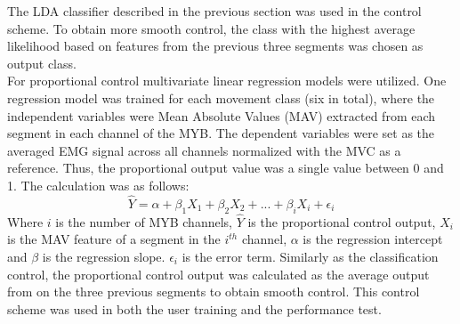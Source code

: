 The LDA classifier described in the previous section was used in the control scheme. To obtain more smooth control, the class with the highest average likelihood based on features from the previous three segments was chosen as output class. \\
For proportional control multivariate linear regression models were utilized. One regression model was trained for each movement class (six in total), where the independent variables were Mean Absolute Values (MAV) extracted from each segment in each channel of the MYB. The dependent variables were set as the averaged EMG signal across all channels normalized with the MVC as a reference. Thus, the proportional output value was a single value between 0 and 1. The calculation was as follows: 
\vspace{-0.2cm}
\begin{equation} \label{eq:P:multiLinearRegression}
\hat{Y} = \alpha + \beta_1 X_{1} + \beta_2 X_{2} + ... + \beta_i X_{i} + \epsilon_i
\end{equation} 
\vspace{-0.12cm}
Where $i$ is the number of MYB channels, $\hat{Y}$ is the proportional control output, $X_{i}$ is the MAV feature of a segment in the $i^{th}$ channel, $\alpha$ is the regression intercept and $\beta$ is the regression slope. $\epsilon_{i}$ is the error term. Similarly as the classification control, the proportional control output was calculated as the average output from on the three previous segments to obtain smooth control. This control scheme was used in both the user training and the performance test.